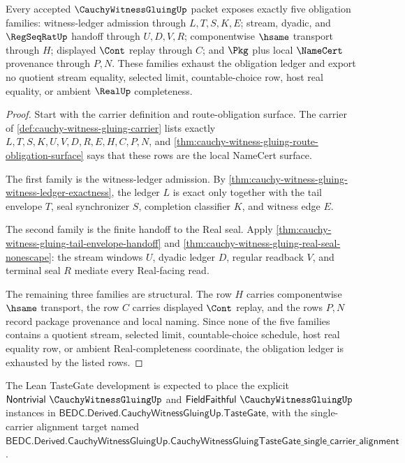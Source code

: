 \begin{theorem}
\label{thm:cauchy-witness-gluing-obligation-ledger}
Every accepted $\CauchyWitnessGluingUp$ packet exposes exactly five obligation families: witness-ledger admission through $L,T,S,K,E$; stream, dyadic, and $\RegSeqRatUp$ handoff through $U,D,V,R$; componentwise $\hsame$ transport through $H$; displayed $\Cont$ replay through $C$; and $\Pkg$ plus local $\NameCert$ provenance through $P,N$. These families exhaust the obligation ledger and export no quotient stream equality, selected limit, countable-choice row, host real equality, or ambient $\RealUp$ completeness.
\end{theorem}
\begin{proof}
Start with the carrier definition and route-obligation surface. The carrier of \autoref{def:cauchy-witness-gluing-carrier} lists exactly $L,T,S,K,U,V,D,R,E,H,C,P,N$, and \autoref{thm:cauchy-witness-gluing-route-obligation-surface} says that these rows are the local NameCert surface.

The first family is the witness-ledger admission. By \autoref{thm:cauchy-witness-gluing-witness-ledger-exactness}, the ledger $L$ is exact only together with the tail envelope $T$, seal synchronizer $S$, completion classifier $K$, and witness edge $E$.

The second family is the finite handoff to the Real seal. Apply \autoref{thm:cauchy-witness-gluing-tail-envelope-handoff} and \autoref{thm:cauchy-witness-gluing-real-seal-nonescape}: the stream windows $U$, dyadic ledger $D$, regular readback $V$, and terminal seal $R$ mediate every Real-facing read.

The remaining three families are structural. The row $H$ carries componentwise $\hsame$ transport, the row $C$ carries displayed $\Cont$ replay, and the rows $P,N$ record package provenance and local naming. Since none of the five families contains a quotient stream, selected limit, countable-choice schedule, host real equality row, or ambient Real-completeness coordinate, the obligation ledger is exhausted by the listed rows.
\end{proof}

The Lean TasteGate development is expected to place the explicit $\mathsf{Nontrivial}\ \CauchyWitnessGluingUp$ and $\mathsf{FieldFaithful}\ \CauchyWitnessGluingUp$ instances in $\mathsf{BEDC.Derived.CauchyWitnessGluingUp.TasteGate}$, with the single-carrier alignment target named $\mathsf{BEDC.Derived.CauchyWitnessGluingUp.CauchyWitnessGluingTasteGate\_single\_carrier\_alignment}$.

